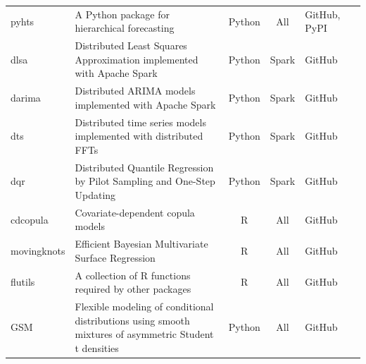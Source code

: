 \documentclass[twoside,a4paper,11pt]{article}
\begin{document}
\begin{refsection}
\begin{center}
{\begin{tabular}{lp{6cm}cclp{3cm}}
pyhts         & A Python package for hierarchical forecasting                                                                                           & Python   & All         & GitHub, PyPI & \citet{ZhangB2023OptimalReconciliation}                     \\
dlsa          & Distributed Least Squares Approximation implemented with Apache Spark                                                                   & Python   & Spark       & GitHub       & \citet{ZhuX2021LeastSquareApproximation}                    \\
darima        & Distributed ARIMA models implemented with Apache Spark                                                                                  & Python   & Spark       & GitHub       & \citet{WangX2023DistributedARIMA}                           \\
dts           & Distributed time series models implemented with distributed FFTs                                                                        & Python   & Spark       & GitHub                                                                     \\
dqr           & Distributed Quantile Regression by Pilot Sampling and One-Step Updating                                                                 & Python   & Spark       & GitHub       & \citet{PanR2022NoteDistributed}                             \\
cdcopula      & Covariate-dependent copula models                                                                                                       & R        & All         & GitHub       & \citet{LiF2018ImprovingForecasting}                         \\
movingknots   & Efficient Bayesian Multivariate Surface Regression                                                                                      & R        & All         & GitHub       & \citet{LiF2013EfficientBayesian}                            \\
flutils       & A collection of R functions required by other packages                                                                    & R        & All         & GitHub                                                                     \\
GSM           & Flexible modeling of conditional distributions using smooth mixtures of asymmetric Student t densities                                  & Python   & All         & GitHub       & \citet{LiF2010FlexibleModeling}                             \\
  \bottomrule
\end{tabular}
}
\end{center}

\end{refsection}
\end{document}
